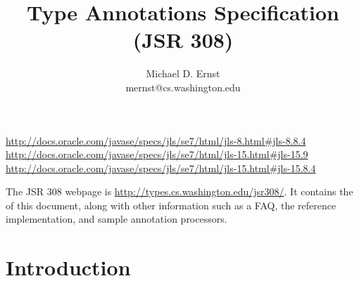\documentclass[10pt]{article}
\title{Type Annotations Specification (JSR 308)}
\author{Michael D. Ernst \\
{\ttfamily mernst@cs.washington.edu}
}
\begin{document}
\def\codesize{\smaller}
\newcommand{\code}[1]{\ifmmode{\mbox{\codesize\ttfamily{#1}}}\else{\codesize\ttfamily #1}\fi}
\def\<#1>{\code{#1}}
\newcommand{\codesmall}[1]{\ifmmode{\mbox{\small\ttfamily{#1}}}\else{\small\ttfamily #1}\fi}
\newcommand{\codefootnotesize}[1]{\ifmmode{\mbox{\footnotesize\ttfamily{#1}}}\else{\footnotesize\ttfamily #1}\fi}
\newcommand{\myurl}[1]{{\codesize\url{#1}}}




\makeatletter
\def\topfigrule{\kern3\p@ \hrule \kern -3.4\p@} %
\def\botfigrule{\kern-3\p@ \hrule \kern 2.6\p@} %
\def\dblfigrule{\kern3\p@ \hrule \kern -3.4\p@} %
\makeatother


\urldef{\jlsEightEightFourURL}\url{http://docs.oracle.com/javase/specs/jls/se7/html/jls-8.html#jls-8.8.4}
\urldef{\jlsFifteenNine}\url{http://docs.oracle.com/javase/specs/jls/se7/html/jls-15.html#jls-15.9}
\urldef{\jlsFifteenEightFour}\url{http://docs.oracle.com/javase/specs/jls/se7/html/jls-15.html#jls-15.8.4}



\maketitle

The JSR 308 webpage is \myurl{http://types.cs.washington.edu/jsr308/}.
It contains the
of this document, along
with other information such as a FAQ, the reference implementation, and
sample annotation processors.



\tableofcontents

\section{Introduction\label{intro}}
\end{document}
